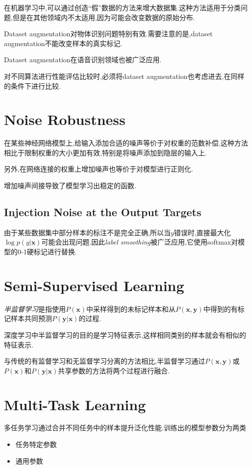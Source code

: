 在机器学习中,可以通过创造``假''数据的方法来增大数据集.这种方法适用于分类问题,但是在其他领域内不太适用,因为可能会改变数据的原始分布.

Dataset augmentation对物体识别问题特别有效.需要注意的是,dataset augmentation不能改变样本的真实标记.

Dataset augmentation在语音识别领域也被广泛应用.

对不同算法进行性能评估比较时,必须将dataset augmentation也考虑进去,在同样的条件下进行比较.

\section{Noise Robustness}

在某些神经网络模型上,给输入添加合适的噪声等价于对权重的范数补偿.这种方法相比于限制权重的大小更加有效,特别是将噪声添加到隐层的输入上.

另外,在网络连接的权重上增加噪声也等价于对模型进行正则化.

增加噪声间接导致了模型学习出稳定的函数.

\subsection{Injection Noise at the Output Targets}

由于某些数据集中部分样本的标注不是完全正确,所以当$y$错误时,直接最大化$\log p(y|\bm x)$可能会出现问题.因此\textit{label smoothing}被广泛应用,它使用softmax对模型的0-1硬标记进行替换.

\section{Semi-Supervised Learning}

\textit{半监督学习}是指使用$P(\bm x)$中采样得到的未标记样本和从$P(\bm{x, y})$中得到的有标记样本共同预测$P(\bm{y|x})$的过程.

深度学习中半监督学习的目的是学习特征表示,这样相同类别的样本就会有相似的特征表示.

与传统的有监督学习和无监督学习分离的方法相比,半监督学习通过$P(\bm{x,y})$或$P(\bm x)$和$P(\bm{y|x})$共享参数的方法将两个过程进行融合.

\section{Multi-Task Learning}

多任务学习通过合并不同任务中的样本提升泛化性能.训练出的模型参数分为两类
\begin{itemize}
    \item 任务特定参数
    \item 通用参数
\end{itemize}

